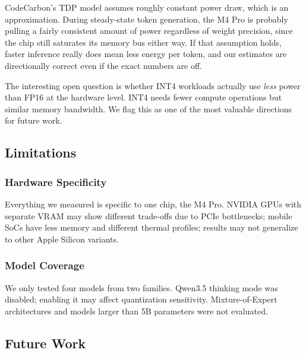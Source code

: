 \documentclass[journal]{IEEEtran}
\begin{document}
CodeCarbon's TDP model assumes roughly constant power draw, which is an approximation. During steady-state token generation, the M4 Pro is probably pulling a fairly consistent amount of power regardless of weight precision, since the chip still saturates its memory bus either way. If that assumption holds, faster inference really does mean less energy per token, and our estimates are directionally correct even if the exact numbers are off.

The interesting open question is whether INT4 workloads actually use \textit{less} power than FP16 at the hardware level. INT4 needs fewer compute operations but similar memory bandwidth. We flag this as one of the most valuable directions for future work.

\subsection{Limitations}

\subsubsection{Hardware Specificity}

Everything we measured is specific to one chip, the M4 Pro. NVIDIA GPUs with separate VRAM may show different trade-offs due to PCIe bottlenecks; mobile SoCs have less memory and different thermal profiles; results may not generalize to other Apple Silicon variants.

\subsubsection{Model Coverage}

We only tested four models from two families. Qwen3.5 thinking mode was disabled; enabling it may affect quantization sensitivity. Mixture-of-Expert architectures and models larger than 5B parameters were not evaluated.

\subsection{Future Work}
\end{document}
